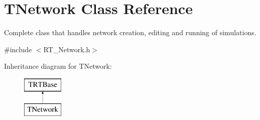 \hypertarget{class_t_network}{\section{T\+Network Class Reference}
\label{class_t_network}
}


Complete class that handles network creation, editing and running of simulations.  




{\ttfamily \#include $<$R\+T\+\_\+\+Network.\+h$>$}

Inheritance diagram for T\+Network\+:\begin{figure}[H]
\begin{center}
\leavevmode
\includegraphics[height=2.000000cm]{class_t_network}
\end{center}
\end{figure}
